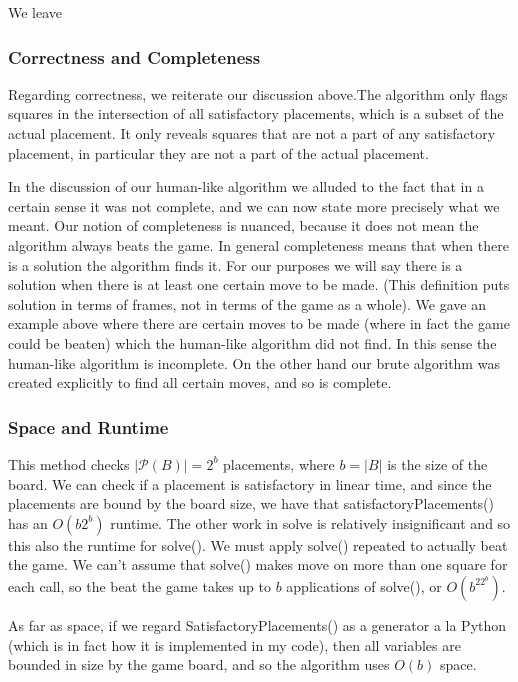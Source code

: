 \documentclass{article}
\theoremstyle{definition}
\theoremstyle{definition}
\theoremstyle{theorem}
\begin{document}
	We leave 
	
	\subsubsection{Correctness and Completeness}
	Regarding correctness, we reiterate our discussion above.The algorithm only flags squares in the intersection of all satisfactory placements, which is a subset of the actual placement. It only reveals squares that are not a part of any satisfactory placement, in particular they are not a part of the actual placement.
	
	In the discussion of our human-like algorithm we alluded to the fact that in a certain sense it was not complete, and we can now state more precisely what we meant. Our notion of completeness is nuanced, because it does not mean the algorithm always beats the game. In general completeness means that when there is a solution the algorithm finds it. For our purposes we will say there is a solution when there is at least one certain move to be made. (This definition puts solution in terms of frames, not in terms of the game as a whole). We gave an example above where there are certain moves to be made (where in fact the game could be beaten) which the human-like algorithm did not find. In this sense the human-like algorithm is incomplete. On the other hand our brute algorithm was created explicitly to find all certain moves, and so is complete.
	
	\subsubsection{Space and Runtime}
	 This method checks $|\mathcal{P}(B)| = 2^{b}$ placements, where $b = |B|$ is the size of the board. We can check if a placement is satisfactory in linear time, and since the placements are bound by the board size, we have that satisfactoryPlacements() has an $O(b2^{b})$ runtime. The other work in solve is relatively insignificant and so this also the runtime for solve(). We must apply solve() repeated to actually beat the game. We can't assume that solve() makes move on more than one square for each call, so the beat the game takes up to $b$ applications of solve(), or $O(b^22^{b})$.
	 
	 As far as space, if we regard SatisfactoryPlacements() as a generator a la Python (which is in fact how it is implemented in my code), then all variables are bounded in size by the game board, and so the algorithm uses $O(b)$ space.
	 
\end{document}
